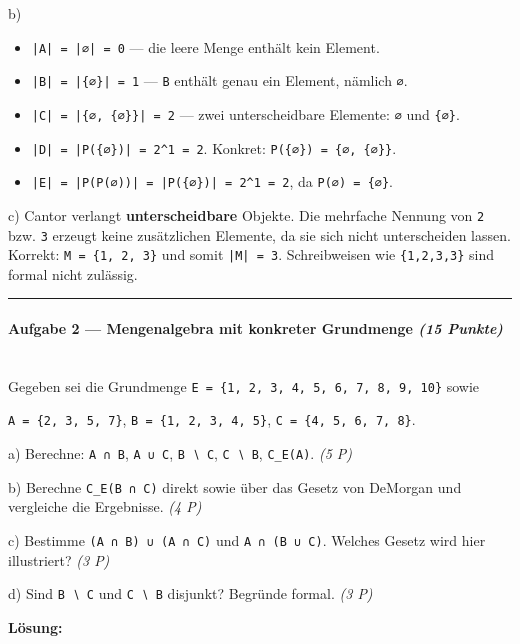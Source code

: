 \documentclass[11pt, a4paper]{article}
\begin{document}
b)

\begin{itemize}
  \item \texttt{|A| = |∅| = 0} — die leere Menge enthält kein Element.
  \item \texttt{|B| = |\{∅\}| = 1} — \texttt{B} enthält genau ein Element, nämlich \texttt{∅}.
  \item \texttt{|C| = |\{∅, \{∅\}\}| = 2} — zwei unterscheidbare Elemente: \texttt{∅} und \texttt{\{∅\}}.
  \item \texttt{|D| = |P(\{∅\})| = 2\textasciicircum{}1 = 2}. Konkret: \texttt{P(\{∅\}) = \{∅, \{∅\}\}}.
  \item \texttt{|E| = |P(P(∅))| = |P(\{∅\})| = 2\textasciicircum{}1 = 2}, da \texttt{P(∅) = \{∅\}}.
\end{itemize}

c) Cantor verlangt \textbf{unterscheidbare} Objekte. Die mehrfache Nennung von \texttt{2} bzw. \texttt{3} erzeugt keine zusätzlichen Elemente, da sie sich nicht unterscheiden lassen. Korrekt: \texttt{M = \{1, 2, 3\}} und somit \texttt{|M| = 3}. Schreibweisen wie \texttt{\{1,2,3,3\}} sind formal nicht zulässig.



\noindent\textcolor{rulegray}{\rule{\linewidth}{0.4pt}}


\paragraph{Aufgabe 2 — Mengenalgebra mit konkreter Grundmenge \textit{(15 Punkte)}}\mbox{}\\[2pt]

Gegeben sei die Grundmenge \texttt{E = \{1, 2, 3, 4, 5, 6, 7, 8, 9, 10\}} sowie


\texttt{A = \{2, 3, 5, 7\}},  \texttt{B = \{1, 2, 3, 4, 5\}},  \texttt{C = \{4, 5, 6, 7, 8\}}.


a) Berechne: \texttt{A ∩ B}, \texttt{A ∪ C}, \texttt{B ∖ C}, \texttt{C ∖ B}, \texttt{C\_E(A)}. \textit{(5 P)}


b) Berechne \texttt{C\_E(B ∩ C)} direkt sowie über das Gesetz von DeMorgan und vergleiche die Ergebnisse. \textit{(4 P)}


c) Bestimme \texttt{(A ∩ B) ∪ (A ∩ C)} und \texttt{A ∩ (B ∪ C)}. Welches Gesetz wird hier illustriert? \textit{(3 P)}


d) Sind \texttt{B ∖ C} und \texttt{C ∖ B} disjunkt? Begründe formal. \textit{(3 P)}


\textbf{Lösung:}
\end{document}
